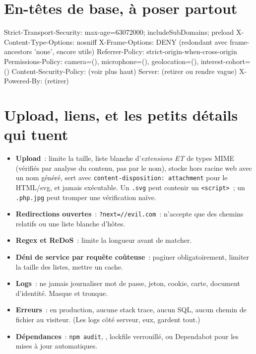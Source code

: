 \section{En-t\^etes de base, \`a poser partout}

\begin{codeconf}
Strict-Transport-Security: max-age=63072000; includeSubDomains; preload
X-Content-Type-Options: nosniff
X-Frame-Options: DENY                     (redondant avec frame-ancestors 'none', encore utile)
Referrer-Policy: strict-origin-when-cross-origin
Permissions-Policy: camera=(), microphone=(), geolocation=(), interest-cohort=()
Content-Security-Policy: (voir plus haut)
Server: (retirer ou rendre vague)
X-Powered-By: (retirer)
\end{codeconf}

\section{Upload, liens, et les petits d\'etails qui tuent}

\begin{itemize}
  \item \textbf{Upload}~: limite la taille, liste blanche d'\emph{extensions ET} de types MIME
        (v\'erifi\'es par analyse du contenu, pas par le nom), stocke hors racine web avec un nom
        g\'en\'er\'e, sert avec \verb|content-disposition: attachment| pour le HTML/svg, et jamais
        ex\'ecutable. Un \verb|.svg| peut contenir un \verb|<script>|~; un \verb|.php.jpg| peut
        tromper une v\'erification na\"ive.
  \item \textbf{Redirections ouvertes}~: \verb|?next=//evil.com|~: n'accepte que des chemins
        relatifs ou une liste blanche d'h\^otes.
  \item \textbf{Regex et ReDoS}~: limite la longueur avant de matcher.
  \item \textbf{D\'eni de service par requ\^ete co\^uteuse}~: paginer obligatoirement, limiter la
        taille des listes, mettre un cache.
  \item \textbf{Logs}~: ne jamais journaliser mot de passe, jeton, cookie, carte, document
        d'identit\'e. Masque et tronque.
  \item \textbf{Erreurs}~: en production, aucune stack trace, aucun SQL, aucun chemin de fichier
        au visiteur. (Les logs c\^ot\'e serveur, eux, gardent tout.)
  \item \textbf{D\'ependances}~: \verb|npm audit|, ,
        lockfile verrouill\'e,  ou
        Dependabot pour les mises \`a jour automatiques.
\end{itemize}

